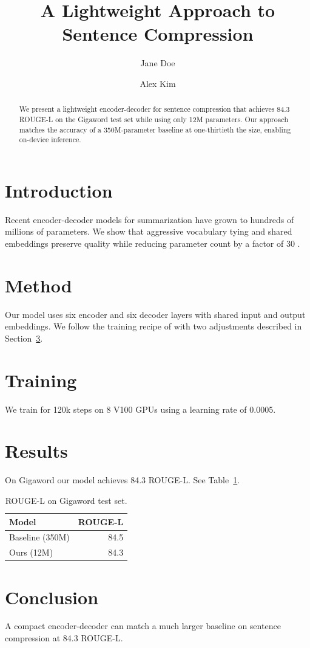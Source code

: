 \documentclass{article}
\title{A Lightweight Approach to Sentence Compression}
\author{Jane Doe \and Alex Kim}
\begin{document}
\maketitle

\begin{abstract}
We present a lightweight encoder-decoder for sentence compression that achieves
84.3 ROUGE-L on the Gigaword test set while using only 12M parameters. Our
approach matches the accuracy of a 350M-parameter baseline at one-thirtieth the
size, enabling on-device inference.
\end{abstract}

\section{Introduction}
Recent encoder-decoder models for summarization have grown to hundreds of
millions of parameters. We show that aggressive vocabulary tying and shared
embeddings preserve quality while reducing parameter count by a factor of 30
\cite{vaswani2017attention}.

\section{Method}
Our model uses six encoder and six decoder layers with shared input and output
embeddings. We follow the training recipe of \cite{vaswani2017attention} with
two adjustments described in Section~\ref{sec:training}.

\section{Training}
\label{sec:training}
We train for 120k steps on 8 V100 GPUs using a learning rate of 0.0005.

\section{Results}
On Gigaword our model achieves 84.3 ROUGE-L. See Table~\ref{tab:results}.

\begin{table}
\centering
\caption{ROUGE-L on Gigaword test set.}
\label{tab:results}
\begin{tabular}{lr}
Model & ROUGE-L \\
\hline
Baseline (350M) & 84.5 \\
Ours (12M) & 84.3 \\
\end{tabular}
\end{table}

\section{Conclusion}
A compact encoder-decoder can match a much larger baseline on sentence
compression at 84.3 ROUGE-L.



\end{document}
